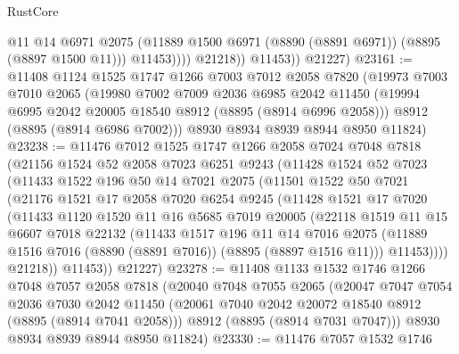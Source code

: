 \begin{lexlean}{RustCore}
\begin{coremodule}
                      @11
                      @14
                      @6971
                      @2075
                      (@11889 @1500 @6971 (@8890 (@8891 @6971)) (@8895 (@8897 @1500 @11)))
                      @11453))))
              @21218))
          @11453))
      @21227)
@23161 := @11408
    @1124
    @1525
    @1747
    @1266
    @7003
    @7012
    @2058
    @7820
    (@19973
      @7003
      @7010
      @2065
      (@19980
        @7002
        @7009
        @2036
        @6985
        @2042
        @11450
        (@19994 @6995 @2042 @20005 @18540 @8912 (@8895 (@8914 @6996 @2058)))
        @8912
        (@8895 (@8914 @6986 @7002)))
      @8930
      @8934
      @8939
      @8944
      @8950
      @11824)
@23238 := @11476
    @7012
    @1525
    @1747
    @1266
    @2058
    @7024
    @7048
    @7818
    (@21156
      @1524
      @52
      @2058
      @7023
      @6251
      @9243
      (@11428
        @1524
        @52
        @7023
        (@11433
          @1522
          @196
          @50
          @14
          @7021
          @2075
          (@11501
            @1522
            @50
            @7021
            (@21176
              @1521
              @17
              @2058
              @7020
              @6254
              @9245
              (@11428
                @1521
                @17
                @7020
                (@11433
                  @1120
                  @1520
                  @11
                  @16
                  @5685
                  @7019
                  @20005
                  (@22118
                    @1519
                    @11
                    @15
                    @6607
                    @7018
                    @22132
                    (@11433
                      @1517
                      @196
                      @11
                      @14
                      @7016
                      @2075
                      (@11889 @1516 @7016 (@8890 (@8891 @7016)) (@8895 (@8897 @1516 @11)))
                      @11453))))
              @21218))
          @11453))
      @21227)
@23278 := @11408
    @1133
    @1532
    @1746
    @1266
    @7048
    @7057
    @2058
    @7818
    (@20040
      @7048
      @7055
      @2065
      (@20047
        @7047
        @7054
        @2036
        @7030
        @2042
        @11450
        (@20061 @7040 @2042 @20072 @18540 @8912 (@8895 (@8914 @7041 @2058)))
        @8912
        (@8895 (@8914 @7031 @7047)))
      @8930
      @8934
      @8939
      @8944
      @8950
      @11824)
@23330 := @11476
    @7057
    @1532
    @1746

\end{coremodule}
\end{lexlean}
